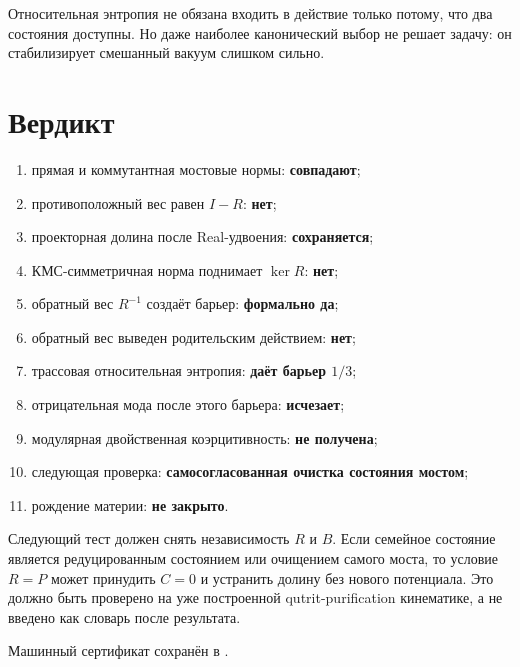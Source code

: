 Относительная энтропия не обязана входить в действие только потому, что
два состояния доступны. Но даже наиболее канонический выбор не решает
задачу: он стабилизирует смешанный вакуум слишком сильно.

\section{Вердикт}

\begin{protocol}
\begin{enumerate}
 \item прямая и коммутантная мостовые нормы:
 \textbf{совпадают};
 \item противоположный вес равен $I-R$:
 \textbf{нет};
 \item проекторная долина после Real-удвоения:
 \textbf{сохраняется};
 \item КМС-симметричная норма поднимает $\ker R$:
 \textbf{нет};
 \item обратный вес $R^{-1}$ создаёт барьер:
 \textbf{формально да};
 \item обратный вес выведен родительским действием:
 \textbf{нет};
 \item трассовая относительная энтропия:
 \textbf{даёт барьер $1/3$};
 \item отрицательная мода после этого барьера:
 \textbf{исчезает};
 \item модулярная двойственная коэрцитивность:
 \textbf{не получена};
 \item следующая проверка:
 \textbf{самосогласованная очистка состояния мостом};
 \item рождение материи:
 \textbf{не закрыто}.
\end{enumerate}
\end{protocol}

Следующий тест должен снять независимость $R$ и $B$. Если семейное
состояние является редуцированным состоянием или очищением самого моста,
то условие $R=P$ может принудить $C=0$ и устранить долину без нового
потенциала. Это должно быть проверено на уже построенной qutrit-purification
кинематике, а не введено как словарь после результата.

Машинный сертификат сохранён в
.